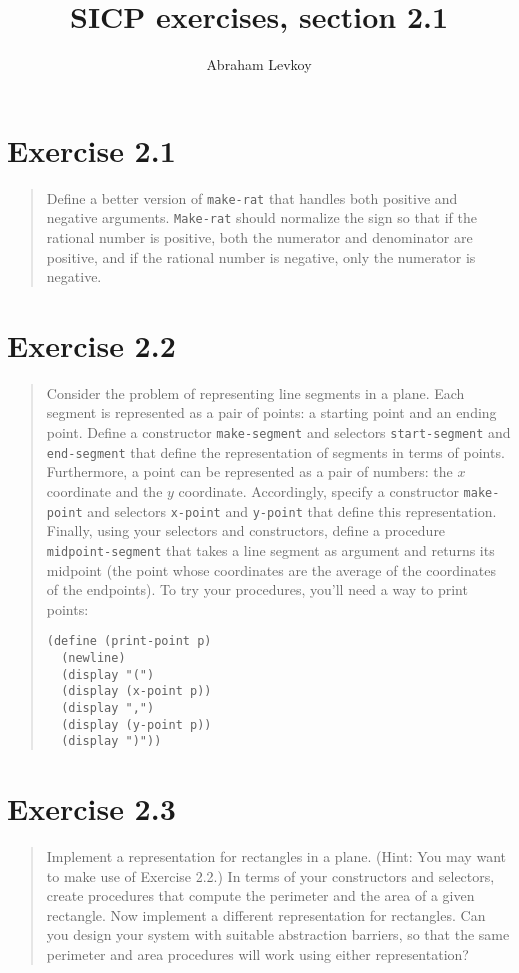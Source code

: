 \documentclass{article}
\author{Abraham Levkoy}
\title{SICP exercises, section 2.1}
\begin{document}
\maketitle

\section{Exercise 2.1}
\begin{quote}
    Define a better version of \texttt{make-rat} that handles both positive and
    negative arguments. \texttt{Make-rat} should normalize the sign so that if
    the rational number is positive, both the numerator and denominator are
    positive, and if the rational number is negative, only the numerator is
    negative.
\end{quote}



\section{Exercise 2.2}
\begin{quote}
    Consider the problem of representing line segments in a plane. Each segment
    is represented as a pair of points: a starting point and an ending point.
    Define a constructor \texttt{make-segment} and selectors
    \texttt{start-segment} and \texttt{end-segment} that define the
    representation of segments in terms of points.  Furthermore, a point can be
    represented as a pair of numbers: the $x$ coordinate and the $y$
    coordinate. Accordingly, specify a constructor \texttt{make-point} and
    selectors \texttt{x-point} and \texttt{y-point} that define this
    representation. Finally, using your selectors and constructors, define a
    procedure \texttt{midpoint-segment} that takes a line segment as argument
    and returns its midpoint (the point whose coordinates are the average of
    the coordinates of the endpoints). To try your procedures, you’ll need a
    way to print points:
    \begin{lstlisting}
(define (print-point p)
  (newline)
  (display "(")
  (display (x-point p))
  (display ",")
  (display (y-point p))
  (display ")"))
    \end{lstlisting}
\end{quote}



\section{Exercise 2.3}
\begin{quote}
    Implement a representation for rectangles in a plane. (Hint: You may want
    to make use of Exercise 2.2.) In terms of your constructors and selectors,
    create procedures that compute the perimeter and the area of a given
    rectangle. Now implement a different representation for rectangles. Can you
    design your system with suitable abstraction barriers, so that the same
    perimeter and area procedures will work using either representation?
\end{quote}
\end{document}
